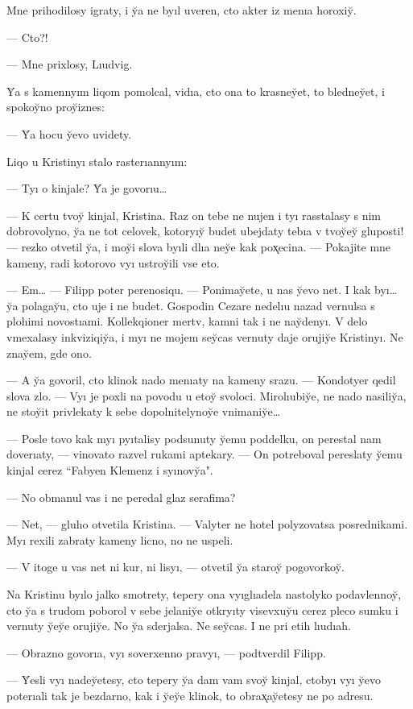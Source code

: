 \documentclass[10pt]{book}
\begin{document}
Mne prihodilosy igraty, i y̆a ne byıl uveren, cto akter iz menıa horoxiy̆.

— Cto?!

— Mne prixlosy, Lıudvig.

Y̆a s kamennyım liqom pomolcal, vidıa, cto ona to krasney̆et, to bledney̆et, i spokoy̆no proy̆iznes:

— Y̆a hocu y̆evo uvidety.

Liqo u Kristinyı stalo rasterıannyım:

— Tyı o kinjale? Y̆a je govorıu…

— K certu tvoy̆ kinjal, Kristina. Raz on tebe ne nujen i tyı rasstalasy s nim dobrovolyno, y̆a ne tot celovek, kotoryıy̆ budet ubejdaty tebıa v tvoy̆ey̆ gluposti! — rezko otvetil y̆a, i moy̆i slova byıli dlıa ney̆e kak pox̨ecina. — Pokajite mne kameny, radi kotorovo vyı ustroy̆ili vse eto.

— Em… — Filipp poter perenosiqu. — Ponimay̆ete, u nas y̆evo net. I kak byı… y̆a polagay̆u, cto uje i ne budet. Gospodin Cezare nedelıu nazad vernulsa s plohimi novostıami. Kollekqioner mertv, kamni tak i ne nay̆denyı. V delo vmexalasy inkviziqiy̆a, i myı ne mojem sey̆cas vernuty daje orujiy̆e Kristinyı. Ne znay̆em, gde ono.

— A y̆a govoril, cto klinok nado menıaty na kameny srazu. — Kondotyer qedil slova zlo. — Vyı je poxli na povodu u etoy̆ svoloci. Mirolıubiy̆e, ne nado nasiliy̆a, ne stoy̆it privlekaty k sebe dopolnitelynoy̆e vnimaniy̆e…

— Posle tovo kak myı pyıtalisy podsunuty y̆emu poddelku, on perestal nam doverıaty, — vinovato razvel rukami aptekary. — On potreboval pereslaty y̆emu kinjal cerez ``Fabyen Klemenz i syınovy̆a".

— No obmanul vas i ne peredal glaz serafima?

— Net, — gluho otvetila Kristina. — Valyter ne hotel polyzovatsa posrednikami. Myı rexili zabraty kameny licno, no ne uspeli.

— V itoge u vas net ni kur, ni lisyı, — otvetil y̆a staroy̆ pogovorkoy̆.

Na Kristinu byılo jalko smotrety, tepery ona vyıglıadela nastolyko podavlennoy̆, cto y̆a s trudom poborol v sebe jelaniy̆e otkryıty visevxuy̆u cerez pleco sumku i vernuty y̆ey̆e orujiy̆e. No y̆a sderjalsa. Ne sey̆cas. I ne pri etih lıudıah.

— Obrazno govorıa, vyı soverxenno pravyı, — podtverdil Filipp.

— Y̆esli vyı nadey̆etesy, cto tepery y̆a dam vam svoy̆ kinjal, ctobyı vyı y̆evo poterıali tak je bezdarno, kak i y̆ey̆e klinok, to obrax̨ay̆etesy ne po adresu.
\end{document}

